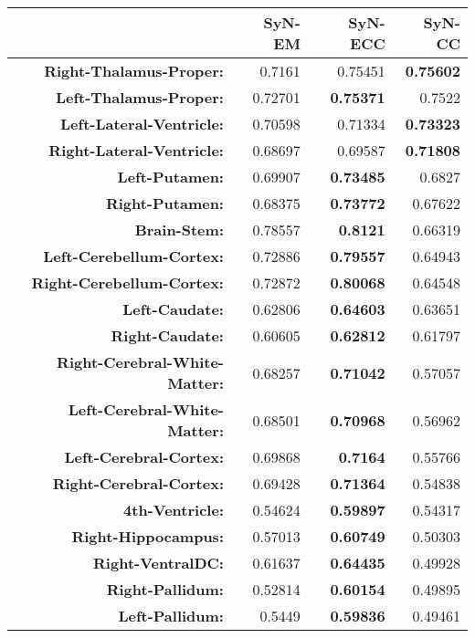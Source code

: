 \begin{table}[htbp]
  \centering
  {\small
    \begin{tabular}{rrrr}
    \toprule
          & \textbf{SyN-EM} & \textbf{SyN-ECC} & \textbf{SyN-CC} \\
    \midrule
    \textbf{Right-Thalamus-Proper:} & 0.7161 & 0.75451 & \textbf{0.75602} \\
    \textbf{Left-Thalamus-Proper:} & 0.72701 & \textbf{0.75371} & 0.7522 \\
    \textbf{Left-Lateral-Ventricle:} & 0.70598 & 0.71334 & \textbf{0.73323} \\
    \textbf{Right-Lateral-Ventricle:} & 0.68697 & 0.69587 & \textbf{0.71808} \\
    \textbf{Left-Putamen:} & 0.69907 & \textbf{0.73485} & 0.6827 \\
    \textbf{Right-Putamen:} & 0.68375 & \textbf{0.73772} & 0.67622 \\
    \textbf{Brain-Stem:} & 0.78557 & \textbf{0.8121} & 0.66319 \\
    \textbf{Left-Cerebellum-Cortex:} & 0.72886 & \textbf{0.79557} & 0.64943 \\
    \textbf{Right-Cerebellum-Cortex:} & 0.72872 & \textbf{0.80068} & 0.64548 \\
    \textbf{Left-Caudate:} & 0.62806 & \textbf{0.64603} & 0.63651 \\
    \textbf{Right-Caudate:} & 0.60605 & \textbf{0.62812} & 0.61797 \\
    \textbf{Right-Cerebral-White-Matter:} & 0.68257 & \textbf{0.71042} & 0.57057 \\
    \textbf{Left-Cerebral-White-Matter:} & 0.68501 & \textbf{0.70968} & 0.56962 \\
    \textbf{Left-Cerebral-Cortex:} & 0.69868 & \textbf{0.7164} & 0.55766 \\
    \textbf{Right-Cerebral-Cortex:} & 0.69428 & \textbf{0.71364} & 0.54838 \\
    \textbf{4th-Ventricle:} & 0.54624 & \textbf{0.59897} & 0.54317 \\
    \textbf{Right-Hippocampus:} & 0.57013 & \textbf{0.60749} & 0.50303 \\
    \textbf{Right-VentralDC:} & 0.61637 & \textbf{0.64435} & 0.49928 \\
    \textbf{Right-Pallidum:} & 0.52814 & \textbf{0.60154} & 0.49895 \\
    \textbf{Left-Pallidum:} & 0.5449 & \textbf{0.59836} & 0.49461 \\

\end{tabular}}
\end{table}
